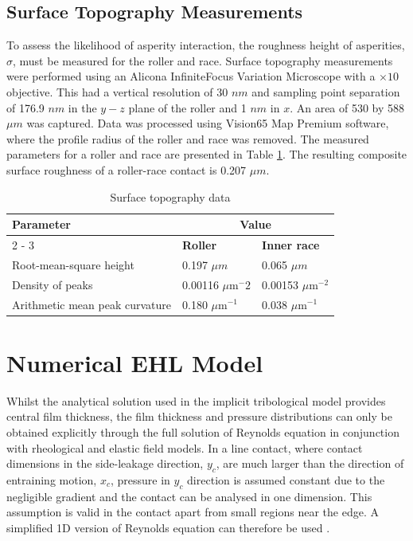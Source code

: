 \subsection{Surface Topography Measurements} \label{Surface Topography}

To assess the likelihood of asperity interaction, the roughness height of asperities, ${\sigma}$, must be measured for the roller and race. Surface topography measurements were performed using an Alicona InfiniteFocus Variation Microscope with a $\times 10$ objective. This had a vertical resolution of 30 $nm$ and sampling point separation of 176.9 $nm$ in the $y-z$ plane of the roller and 1 $nm$ in $x$. An area of 530 by 588 $\mu m$ was captured. Data was processed using Vision65 Map Premium software, where the profile radius of the roller and race was removed. The measured parameters for a roller and race are presented in Table \ref{Surface Topography Data}. The resulting composite surface roughness of a roller-race contact is 0.207 $\mu m$.


\begin{table}
	\caption{Surface topography data}
	\label{Surface Topography Data}
	\centering
	\renewcommand{\arraystretch}{1.5}%
	\begin{tabular}{|p{5.5cm}<{\centering}|p{3.5cm}<{\centering}|p{3.5cm}<{\centering}|}
		\hline 
		\multirow{2}{*}{\textbf{Parameter}} & \multicolumn{2}{|c|}{\textbf{Value}} \\ 
		\cline { 2 - 3 } 
		& \textbf{Roller} & \textbf{Inner race} \\
		\hline 
		Root-mean-square height & 0.197 $\mu m$ & 0.065 $\mu m$ \\
		\hline 
		Density of peaks& 0.00116 $\mu \mathrm{m}^-2$ & 0.00153 $\mu \mathrm{m}^{-2}$  \\
		\hline 
		Arithmetic mean peak curvature & 0.180 $\mu \mathrm{m}^{-1}$ & 0.038 $\mu \mathrm{m}^{-1}$ \\
		\hline 
	\end{tabular}
\end{table}


\section{Numerical EHL Model}\label{1D EHL Model}

Whilst the analytical solution used in the implicit tribological model provides central film thickness, the film thickness and pressure distributions can only be obtained explicitly through the full solution of Reynolds equation in conjunction with rheological and elastic field models. In a line contact, where contact dimensions in the side-leakage direction, $y_c$, are much larger than the direction of entraining motion, $x_c$, pressure in $y_c$ direction is assumed constant due to the negligible gradient and the contact can be analysed in one dimension. This assumption is valid in the contact apart from small regions near the edge. A simplified 1D version of Reynolds equation can therefore be used \cite{Gupta1979}.

